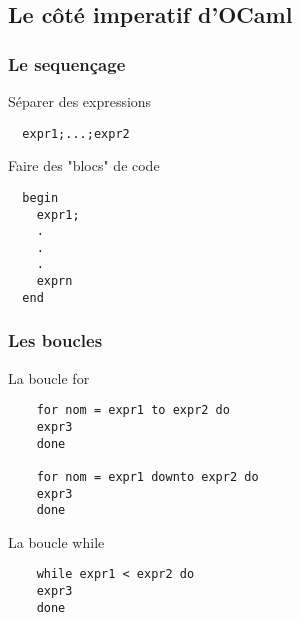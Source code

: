 \subsection{Le côté imperatif d'OCaml} %

\begin{frame}[fragile]
  \frametitle{Le sequençage}
  \begin{block}{Séparer des expressions}
  \begin{lstlisting}
  expr1;...;expr2
  \end{lstlisting}
 \end{block}
  \begin{block}{Faire des "blocs" de code}
  \begin{lstlisting}
  begin
    expr1; 
    .
    .
    .
    exprn
  end
  \end{lstlisting}
 \end{block}
\end{frame}

\begin{frame}[fragile]
    \frametitle{Les boucles}
    \begin{block}{La boucle for}
	\begin{lstlisting}
	for nom = expr1 to expr2 do 
	expr3
	done

	for nom = expr1 downto expr2 do
	expr3
	done
	\end{lstlisting}
      \end{block}
	\begin{block}{La boucle while}
	\begin{lstlisting}
	while expr1 < expr2 do
	expr3
	done
      \end{lstlisting}
  \end{block}
\end{frame}
